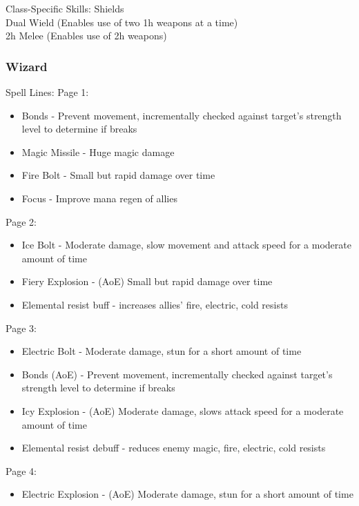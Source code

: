 \documentclass{article}
\begin{document}
Class-Specific Skills:
Shields\\
Dual Wield (Enables use of two 1h weapons at a time)\\
2h Melee (Enables use of 2h weapons)\\


\subsubsection{Wizard}
Spell Lines:
Page 1:
\begin{itemize}
    \item Bonds - Prevent movement, incrementally checked against target's strength level to determine if breaks
    \item Magic Missile - Huge magic damage
    \item Fire Bolt - Small but rapid damage over time
    \item Focus - Improve mana regen of allies
    
\end{itemize}

Page 2:
\begin{itemize}
    \item Ice Bolt - Moderate damage, slow movement and attack speed for a moderate amount of time
    \item Fiery Explosion - (AoE) Small but rapid damage over time
    \item Elemental resist buff - increases allies' fire, electric, cold resists
    
\end{itemize}

Page 3:
\begin{itemize}
    \item Electric Bolt - Moderate damage, stun for a short amount of time
    \item Bonds (AoE) - Prevent movement, incrementally checked against target's strength level to
        determine if breaks
    \item Icy Explosion - (AoE) Moderate damage, slows attack speed for a moderate amount of time
    \item Elemental resist debuff - reduces enemy magic, fire, electric, cold resists
    
\end{itemize}

Page 4:
\begin{itemize}
    \item Electric Explosion - (AoE) Moderate damage, stun for a short amount of time
    
\end{itemize}
\end{document}
